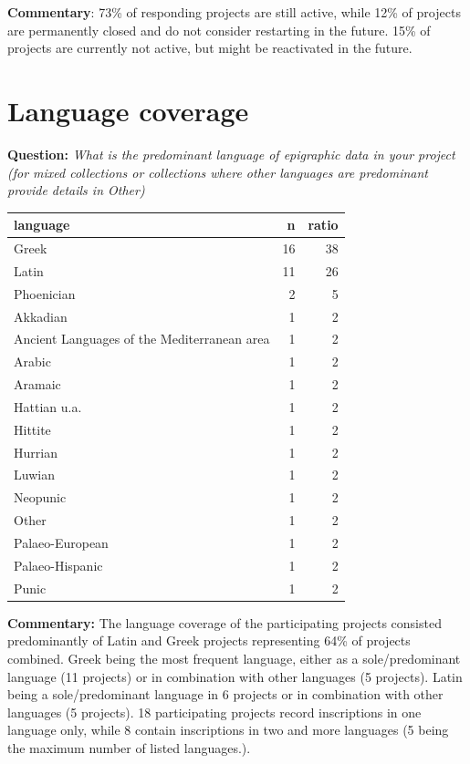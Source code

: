 \documentclass[
  12pt,
]{scrreprt}
\begin{document}
\normalsize

\textbf{Commentary}: 73\% of responding projects are still active, while
12\% of projects are permanently closed and do not consider restarting
in the future. 15\% of projects are currently not active, but might be
reactivated in the future.

\hypertarget{language-coverage-1}{%
\section{Language coverage}\label{language-coverage-1}}

\textbf{Question:} \emph{What is the predominant language of epigraphic
data in your project (for mixed collections or collections where other
languages are predominant provide details in Other)}

\footnotesize

\begin{longtable}[]{@{}lrr@{}}
\toprule
language & n & ratio \\
\midrule
\endhead
Greek & 16 & 38 \\
Latin & 11 & 26 \\
Phoenician & 2 & 5 \\
Akkadian & 1 & 2 \\
Ancient Languages of the Mediterranean area & 1 & 2 \\
Arabic & 1 & 2 \\
Aramaic & 1 & 2 \\
Hattian u.a. & 1 & 2 \\
Hittite & 1 & 2 \\
Hurrian & 1 & 2 \\
Luwian & 1 & 2 \\
Neopunic & 1 & 2 \\
Other & 1 & 2 \\
Palaeo-European & 1 & 2 \\
Palaeo-Hispanic & 1 & 2 \\
Punic & 1 & 2 \\
\bottomrule
\end{longtable}

\normalsize

\footnotesize

\normalsize

\textbf{Commentary:} The language coverage of the participating projects
consisted predominantly of Latin and Greek projects representing 64\% of
projects combined. Greek being the most frequent language, either as a
sole/predominant language (11 projects) or in combination with other
languages (5 projects). Latin being a sole/predominant language in 6
projects or in combination with other languages (5 projects). 18
participating projects record inscriptions in one language only, while 8
contain inscriptions in two and more languages (5 being the maximum
number of listed languages.).
\end{document}
